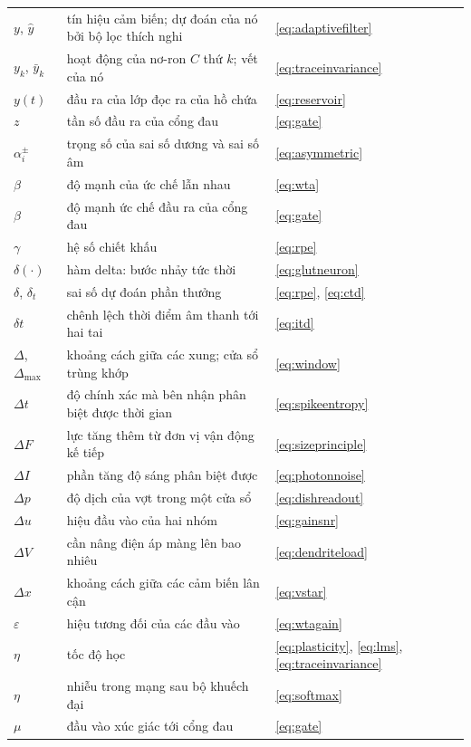 \begin{center}
\begin{longtable}{>{\raggedright}p{2.0cm}>{\raggedright}p{9.6cm}>{\raggedright\arraybackslash}p{2.4cm}}
$y$, $\hat y$ & tín hiệu cảm biến; dự đoán của nó bởi bộ lọc thích nghi & \eqref{eq:adaptivefilter} \\
$y_k$, $\bar y_k$ & hoạt động của nơ-ron $C$ thứ $k$; vết của nó & \eqref{eq:traceinvariance} \\
$y(t)$ & đầu ra của lớp đọc ra của hồ chứa & \eqref{eq:reservoir} \\
$z$ & tần số đầu ra của cổng đau & \eqref{eq:gate} \\
\midrule
$\alpha_i^\pm$ & trọng số của sai số dương và sai số âm & \eqref{eq:asymmetric} \\
$\beta$ & độ mạnh của ức chế lẫn nhau & \eqref{eq:wta} \\
$\beta$ & độ mạnh ức chế đầu ra của cổng đau & \eqref{eq:gate} \\
$\gamma$ & hệ số chiết khấu & \eqref{eq:rpe} \\
$\delta(\cdot)$ & hàm delta: bước nhảy tức thời & \eqref{eq:glutneuron} \\
$\delta$, $\delta_t$ & sai số dự đoán phần thưởng & \eqref{eq:rpe}, \eqref{eq:ctd} \\
$\delta t$ & chênh lệch thời điểm âm thanh tới hai tai & \eqref{eq:itd} \\
$\Delta$, $\Delta_{\max}$ & khoảng cách giữa các xung; cửa sổ trùng khớp & \eqref{eq:window} \\
$\Delta t$ & độ chính xác mà bên nhận phân biệt được thời gian & \eqref{eq:spikeentropy} \\
$\Delta F$ & lực tăng thêm từ đơn vị vận động kế tiếp & \eqref{eq:sizeprinciple} \\
$\Delta I$ & phần tăng độ sáng phân biệt được & \eqref{eq:photonnoise} \\
$\Delta p$ & độ dịch của vợt trong một cửa sổ & \eqref{eq:dishreadout} \\
$\Delta u$ & hiệu đầu vào của hai nhóm & \eqref{eq:gainsnr} \\
$\Delta V$ & cần nâng điện áp màng lên bao nhiêu & \eqref{eq:dendriteload} \\
$\Delta x$ & khoảng cách giữa các cảm biến lân cận & \eqref{eq:vstar} \\
$\varepsilon$ & hiệu tương đối của các đầu vào & \eqref{eq:wtagain} \\
$\eta$ & tốc độ học & \eqref{eq:plasticity}, \eqref{eq:lms}, \eqref{eq:traceinvariance} \\
$\eta$ & nhiễu trong mạng sau bộ khuếch đại & \eqref{eq:softmax} \\
$\mu$ & đầu vào xúc giác tới cổng đau & \eqref{eq:gate} \\

\end{longtable}
\end{center}
